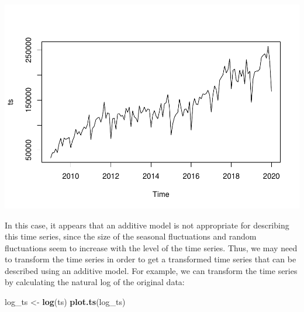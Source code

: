 \documentclass[
]{article}
\newenvironment{Shaded}{\begin{snugshade}}{\end{snugshade}}
\newcommand{\DataTypeTok}[1]{\textcolor[rgb]{0.13,0.29,0.53}{#1}}
\newcommand{\DecValTok}[1]{\textcolor[rgb]{0.00,0.00,0.81}{#1}}
\newcommand{\KeywordTok}[1]{\textcolor[rgb]{0.13,0.29,0.53}{\textbf{#1}}}
\newcommand{\NormalTok}[1]{#1}
\newcommand{\OperatorTok}[1]{\textcolor[rgb]{0.81,0.36,0.00}{\textbf{#1}}}
\newcommand{\OtherTok}[1]{\textcolor[rgb]{0.56,0.35,0.01}{#1}}
\newcommand{\StringTok}[1]{\textcolor[rgb]{0.31,0.60,0.02}{#1}}
\begin{document}
\begin{Shaded}
\end{Shaded}

\includegraphics{tsf_export_files/figure-latex/unnamed-chunk-4-1.pdf}

In this case, it appears that an additive model is not appropriate for
describing this time series, since the size of the seasonal fluctuations
and random fluctuations seem to increase with the level of the time
series. Thus, we may need to transform the time series in order to get a
transformed time series that can be described using an additive model.
For example, we can transform the time series by calculating the natural
log of the original data:

\begin{Shaded}
\begin{Highlighting}[]
\NormalTok{log_ts <-}\StringTok{ }\KeywordTok{log}\NormalTok{(ts)}
\KeywordTok{plot.ts}\NormalTok{(log_ts)}
\end{Highlighting}
\end{Shaded}
\end{document}
